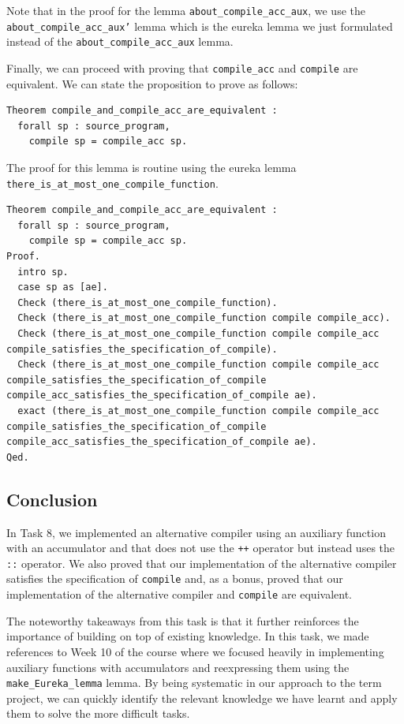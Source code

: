 \documentclass{article}
\begin{document}
Note that in the proof for the lemma \texttt{about\_compile\_acc\_aux}, we use the \texttt{about\_compile\_acc\_aux'} lemma which is the eureka lemma we just formulated instead of the \texttt{about\_compile\_acc\_aux} lemma.

Finally, we can proceed with proving that \texttt{compile\_acc} and \texttt{compile} are equivalent. We can state the proposition to prove as follows:

\begin{lstlisting}
Theorem compile_and_compile_acc_are_equivalent :
  forall sp : source_program,
    compile sp = compile_acc sp.
\end{lstlisting}

The proof for this lemma is routine using the eureka lemma \texttt{there\_is\_at\_most\_one\_compile\_function}.

\begin{lstlisting}
Theorem compile_and_compile_acc_are_equivalent :
  forall sp : source_program,
    compile sp = compile_acc sp.
Proof.
  intro sp.
  case sp as [ae].
  Check (there_is_at_most_one_compile_function).
  Check (there_is_at_most_one_compile_function compile compile_acc).
  Check (there_is_at_most_one_compile_function compile compile_acc compile_satisfies_the_specification_of_compile).
  Check (there_is_at_most_one_compile_function compile compile_acc compile_satisfies_the_specification_of_compile compile_acc_satisfies_the_specification_of_compile ae).
  exact (there_is_at_most_one_compile_function compile compile_acc compile_satisfies_the_specification_of_compile compile_acc_satisfies_the_specification_of_compile ae).
Qed.
\end{lstlisting}

\subsection{Conclusion}

In Task 8, we implemented an alternative compiler using an auxiliary function with an accumulator and that does not use the \texttt{++} operator but instead uses the \texttt{::} operator. We also proved that our implementation of the alternative compiler satisfies the specification of \texttt{compile} and, as a bonus, proved that our implementation of the alternative compiler and \texttt{compile} are equivalent.

The noteworthy takeaways from this task is that it further reinforces the importance of building on top of existing knowledge. In this task, we made references to Week 10 of the course where we focused heavily in implementing auxiliary functions with accumulators and reexpressing them using the \texttt{make\_Eureka\_lemma} lemma. By being systematic in our approach to the term project, we can quickly identify the relevant knowledge we have learnt and apply them to solve the more difficult tasks.
\end{document}
